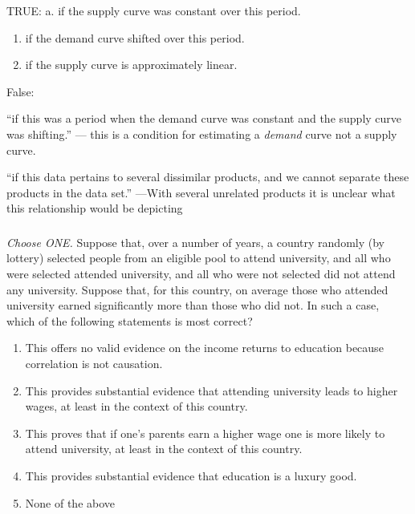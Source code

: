 \documentclass[]{article}
\begin{document}
TRUE: a. if the supply curve was constant over this period.

\begin{enumerate}
\def\labelenumi{\alph{enumi}.}
\setcounter{enumi}{3}
\item
  if the demand curve shifted over this period.
\item
  if the supply curve is approximately linear.
\end{enumerate}

False:

``if this was a period when the demand curve was constant and the supply
curve was shifting.'' --- this is a condition for estimating a
\emph{demand} curve not a supply curve.

``if this data pertains to several dissimilar products, and we cannot
separate these products in the data set.'' ---With several unrelated
products it is unclear what this relationship would be depicting

\hypertarget{section-2}{%
\subsubsection{}\label{section-2}}

\emph{Choose ONE.} Suppose that, over a number of years, a country
randomly (by lottery) selected people from an eligible pool to attend
university, and all who were selected attended university, and all who
were not selected did not attend any university. Suppose that, for this
country, on average those who attended university earned significantly
more than those who did not. In such a case, which of the following
statements is most correct?

\begin{enumerate}
\def\labelenumi{\Alph{enumi}.}
\item
  This offers no valid evidence on the income returns to education
  because correlation is not causation.
\item
  This provides substantial evidence that attending university leads to
  higher wages, at least in the context of this country.
\item
  This proves that if one's parents earn a higher wage one is more
  likely to attend university, at least in the context of this country.
\item
  This provides substantial evidence that education is a luxury good.
\item
  None of the above
\end{enumerate}
\end{document}
